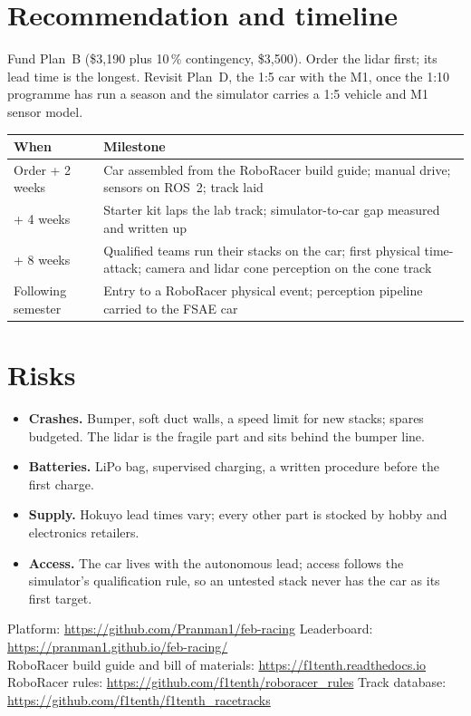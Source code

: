 \documentclass[11pt,a4paper]{article}
\begin{document}
\section{Recommendation and timeline}

Fund Plan~B (\$3{,}190 plus 10\,\% contingency, \$3{,}500). Order the lidar first; its
lead time is the longest. Revisit Plan~D, the 1:5 car with the M1, once the 1:10 programme has
run a season and the simulator carries a 1:5 vehicle and M1 sensor model.

\begin{tabularx}{\linewidth}{lX}
\toprule
When & Milestone \\
\midrule
Order + 2 weeks & Car assembled from the RoboRacer build guide; manual drive; sensors on ROS~2; track laid \\
+ 4 weeks & Starter kit laps the lab track; simulator-to-car gap measured and written up \\
+ 8 weeks & Qualified teams run their stacks on the car; first physical time-attack; camera and lidar cone perception on the cone track \\
Following semester & Entry to a RoboRacer physical event; perception pipeline carried to the FSAE car \\
\bottomrule
\end{tabularx}

\section{Risks}

\begin{itemize}
  \item \textbf{Crashes.} Bumper, soft duct walls, a speed limit for new stacks; spares budgeted. The lidar is the fragile part and sits behind the bumper line.
  \item \textbf{Batteries.} LiPo bag, supervised charging, a written procedure before the first charge.
  \item \textbf{Supply.} Hokuyo lead times vary; every other part is stocked by hobby and electronics retailers.
  \item \textbf{Access.} The car lives with the autonomous lead; access follows the simulator's qualification rule, so an untested stack never has the car as its first target.
\end{itemize}

\bigskip
\noindent Platform: \url{https://github.com/Pranman1/feb-racing} \quad Leaderboard: \url{https://pranman1.github.io/feb-racing/}\\
RoboRacer build guide and bill of materials: \url{https://f1tenth.readthedocs.io}\\
RoboRacer rules: \url{https://github.com/f1tenth/roboracer_rules} \quad Track database: \url{https://github.com/f1tenth/f1tenth_racetracks}
\end{document}

